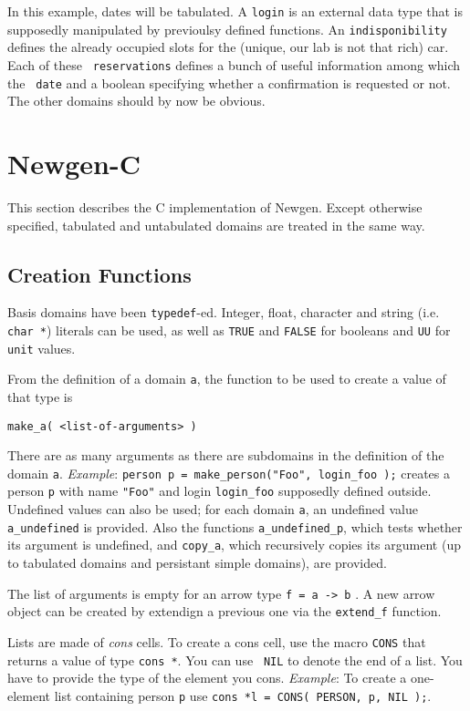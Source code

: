 In this example, dates will be tabulated. A {\tt login} is an
external data type that is supposedly manipulated by previoulsy defined
functions. An {\tt indisponibility} defines the already occupied slots
for the (unique, our lab is not that rich) car. Each of these {\tt
reservations} defines a bunch of useful information among which the {\tt
date} and a boolean specifying whether a confirmation is requested or
not. The other domains should by now be obvious.

\section{Newgen-C}

This section describes the C implementation of Newgen. Except otherwise
specified, tabulated and untabulated domains are treated in the same way.

\subsection{Creation Functions}

Basis domains have been {\tt typedef}-ed. Integer, float, character and
string (i.e. {\tt char *}) literals can be used, as well as {\tt TRUE}
and {\tt FALSE} for booleans and {\tt UU} for {\tt unit} values.

From the definition of a domain {\tt a}, the function to be used to
create a value of that type is 
\begin{center}
{\tt make\_a( <list-of-arguments> )}
\end{center}
There are as many arguments as there are subdomains in the definition of
the domain {\tt a}.  {\em Example}: {\tt person p = make\_person("Foo",
login\_foo );} creates a person {\tt p} with name {\tt "Foo"} and login
{\tt login\_foo} supposedly defined outside.  Undefined values can also
be used; for each domain {\tt a}, an undefined value {\tt a\_undefined}
is provided.  Also the functions {\tt a\_undefined\_p}, which tests
whether its argument is undefined, and {\tt copy\_a}, which recursively
copies its argument (up to tabulated domains and persistant simple
domains), are provided.  

The list of arguments is empty for an arrow type {\tt f = a \verb:->:
b} .  A new arrow object can be created by extendign a previous one
via the {\tt extend\_f} function.

Lists are made of {\em cons} cells. To create a cons cell, use the macro
{\tt CONS} that returns a value of type {\tt cons *}. You can use {\tt
NIL} to denote the end of a list. You have to provide the type
of the element you cons.
{\em Example}: To create a one-element list
containing person {\tt p} use {\tt cons *l = CONS( PERSON, p, NIL );}.

